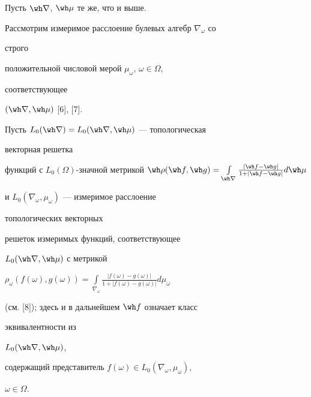  


Пусть $\wh\nabla$, $\wh\mu$ те же, что и выше. 


Рассмотрим измеримое расслоение булевых алгебр $\nabla_\omega$ со 


строго 


положительной числовой мерой $\mu_\omega$, $\omega\in\Omega$, 


соответствующее 


$(\wh\nabla,\wh\mu)$ [6], [7]. 


Пусть $L_0(\wh\nabla)=L_0(\wh\nabla,\wh\mu)$ --- топологическая 


векторная решетка 


функций с $L_0(\Omega)$-значной метрикой $\wh\rho(\wh f,\wh 


g)=\int\limits_{\wh\nabla}\frac{|\wh f-\wh g|}{1+|\wh f-\wh g|}d\wh\mu$ 


и $L_0(\nabla_\omega,\mu_\omega)$ --- измеримое расслоение 


топологических векторных 


решеток измеримых функций, соответствующее 


$L_0(\wh\nabla,\wh\mu)$ с метрикой 


$\rho_\omega(f(\omega),g(\omega))=\int\limits_{\nabla_\omega} 


\frac{|f(\omega)-g(\omega)|}{1+|f(\omega)-g(\omega)|}d\mu_\omega$ 


(см. [8]); здесь и в дальнейшем $\wh f$ означает класс 


эквивалентности из 


$L_0(\wh\nabla,\wh\mu)$, 


содержащий представитель $f(\omega)\in L_0(\nabla_\omega,\mu_\omega)$, 


$\omega\in\Omega$. 


 


